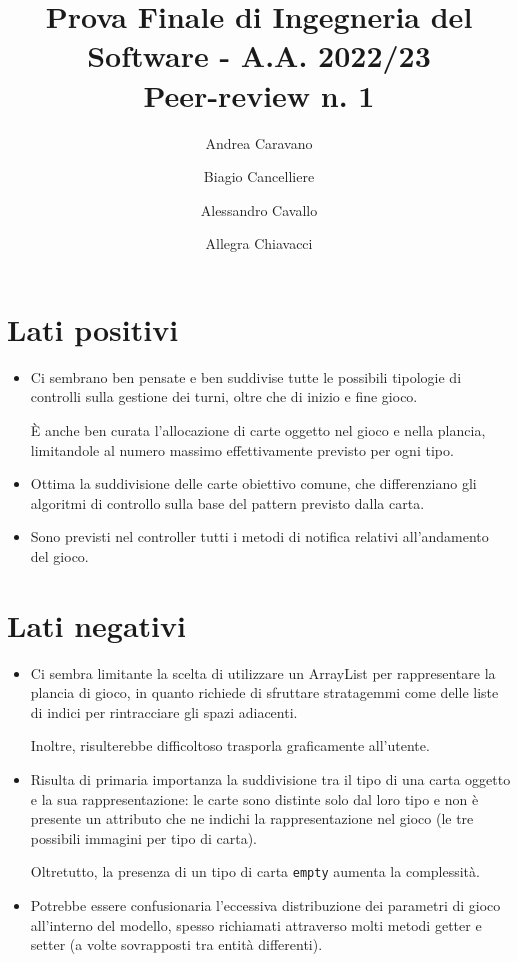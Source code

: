 \documentclass[a4paper,11pt]{article} %
\begin{document}
    \pagestyle{fancy}
    \fancyhead{}\fancyfoot{}
    \fancyfoot[C]{\thepage}

    \author{Andrea Caravano \and Biagio Cancelliere \and Alessandro Cavallo \and Allegra Chiavacci}
    \title{\textbf{\Large{Prova Finale di Ingegneria del Software - A.A. 2022/23\\Peer-review n. 1}}}
    \maketitle


    \section{Lati positivi}\label{sec:lati-positivi}
    \begin{itemize}
        \item Ci sembrano ben pensate e ben suddivise tutte le possibili tipologie di controlli sulla gestione dei turni,
        oltre che di inizio e fine gioco.

        È anche ben curata l'allocazione di carte oggetto nel gioco e nella plancia, limitandole al numero massimo
        effettivamente previsto per ogni tipo.
        \item Ottima la suddivisione delle carte obiettivo comune, che differenziano gli algoritmi di controllo sulla base
        del pattern previsto dalla carta.
        \item Sono previsti nel controller tutti i metodi di notifica relativi all'andamento del gioco.
    \end{itemize}


    \section{Lati negativi}\label{sec:lati-negativi}
    \begin{itemize}
        \item Ci sembra limitante la scelta di utilizzare un ArrayList per rappresentare la plancia di gioco,
        in quanto richiede di sfruttare stratagemmi come delle liste di indici per rintracciare gli spazi adiacenti.

        Inoltre, risulterebbe difficoltoso trasporla graficamente all'utente.
        \item Risulta di primaria importanza la suddivisione tra il tipo di una carta oggetto e la sua rappresentazione:
        le carte sono distinte solo dal loro tipo e non è presente un attributo che ne indichi
        la rappresentazione nel gioco (le tre possibili immagini per tipo di carta).

        Oltretutto, la presenza di un tipo di carta \texttt{empty} aumenta la complessità.
        \item Potrebbe essere confusionaria l'eccessiva distribuzione dei parametri di gioco all'interno del
        modello, spesso richiamati attraverso molti metodi getter e setter (a volte sovrapposti tra entità differenti).
    \end{itemize}
\end{document}
